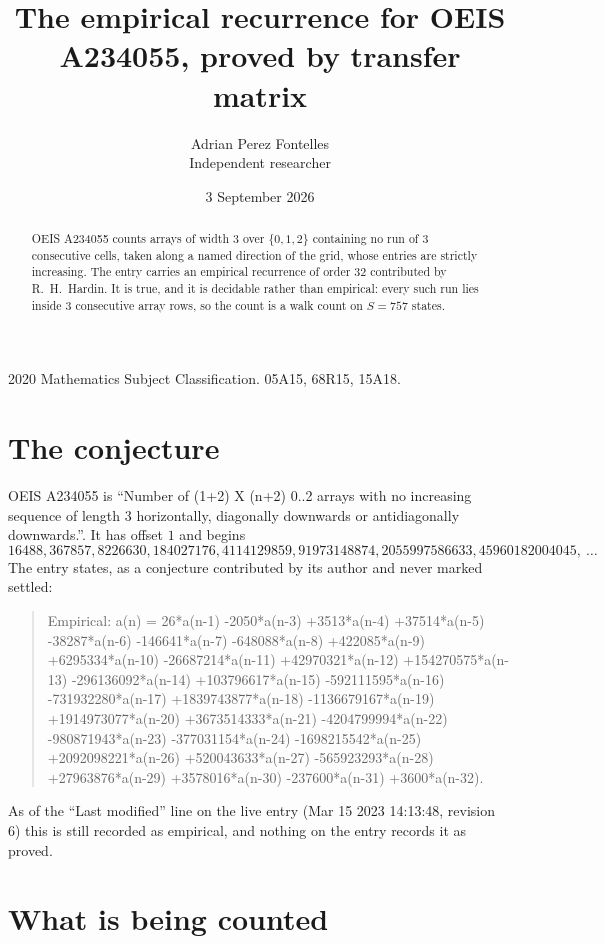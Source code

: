 \documentclass[11pt,a4paper]{article}
\title{The empirical recurrence for OEIS A234055, proved by transfer matrix}
\author{Adrian Perez Fontelles\\ \small Independent researcher}
\date{3 September 2026}
\theoremstyle{plain}
\theoremstyle{definition}
\begin{document}
\maketitle

\begin{abstract}
OEIS A234055 counts arrays of width $3$ over $\{0,1,2\}$ containing no run of $3$ consecutive
cells, taken along a named direction of the grid, whose entries are strictly increasing. The entry carries
an empirical recurrence of order $32$ contributed by R.~H.~Hardin. It is true, and it is
decidable rather than empirical: every such run lies inside $3$ consecutive array rows, so
the count is a walk count on $S=757$ states.
\end{abstract}

\noindent\small 2020 Mathematics Subject Classification. 05A15, 68R15, 15A18.\normalsize

\section{The conjecture}

OEIS A234055 is ``Number of (1+2) X (n+2) 0..2 arrays with no increasing sequence of length 3 horizontally, diagonally downwards or antidiagonally downwards.''. It has offset $1$ and begins
\[
16488, 367857, 8226630, 184027176, 4114129859, 91973148874, 2055997586633, 45960182004045,\ \dots
\]
The entry states, as a conjecture contributed by its author and never marked settled:
\begin{quote}
Empirical: a(n) = 26*a(n-1) -2050*a(n-3) +3513*a(n-4) +37514*a(n-5) -38287*a(n-6) -146641*a(n-7) -648088*a(n-8) +422085*a(n-9) +6295334*a(n-10) -26687214*a(n-11) +42970321*a(n-12) +154270575*a(n-13) -296136092*a(n-14) +103796617*a(n-15) -592111595*a(n-16) -731932280*a(n-17) +1839743877*a(n-18) -1136679167*a(n-19) +1914973077*a(n-20) +3673514333*a(n-21) -4204799994*a(n-22) -980871943*a(n-23) -377031154*a(n-24) -1698215542*a(n-25) +2092098221*a(n-26) +520043633*a(n-27) -565923293*a(n-28) +27963876*a(n-29) +3578016*a(n-30) -237600*a(n-31) +3600*a(n-32).
\end{quote}
As of the ``Last modified'' line on the live entry (Mar 15 2023 14:13:48, revision 6) this is still
recorded as empirical, and nothing on the entry records it as proved.

\section{What is being counted}
\end{document}
